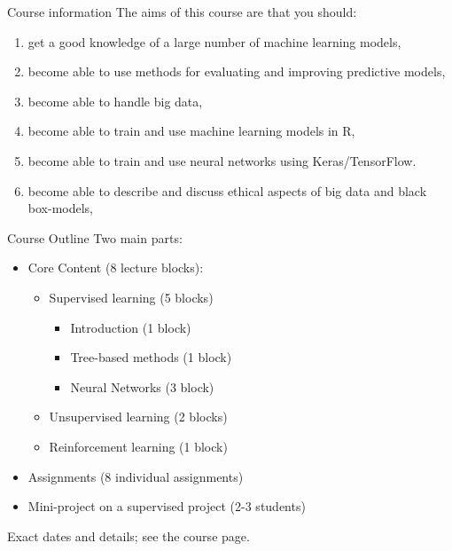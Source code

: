 \documentclass[10pt,handout]{beamer}
\begin{document}
\begin{frame}{Course information}
The aims of this course are that you should:\\[3mm]\pause
\begin{enumerate}
\item get a good knowledge of a large number of machine learning models,
\item become able to use methods for evaluating and improving predictive models,
\item become able to handle big data,
\item become able to train and use machine learning models in R,
\item become able to train and use neural networks using Keras/TensorFlow.
\item become able to describe and discuss ethical aspects of big data and black box-models,
\end{enumerate}

\end{frame}


\begin{frame}{Course Outline}
Two main parts:
\begin{itemize}
\item Core Content (8 lecture blocks):
\begin{itemize}
\item Supervised learning (5 blocks)
\begin{itemize}
\item Introduction (1 block)
\item Tree-based methods (1 block)
\item Neural Networks (3 block)
\end{itemize}
\item Unsupervised learning (2 blocks)
\item Reinforcement learning (1 block)\pause
\end{itemize}
\item Assignments (8 individual assignments)\pause
\item Mini-project on a supervised project (2-3 students)\pause
\end{itemize}
Exact dates and details; see the course page.
\end{frame}
\end{document}
